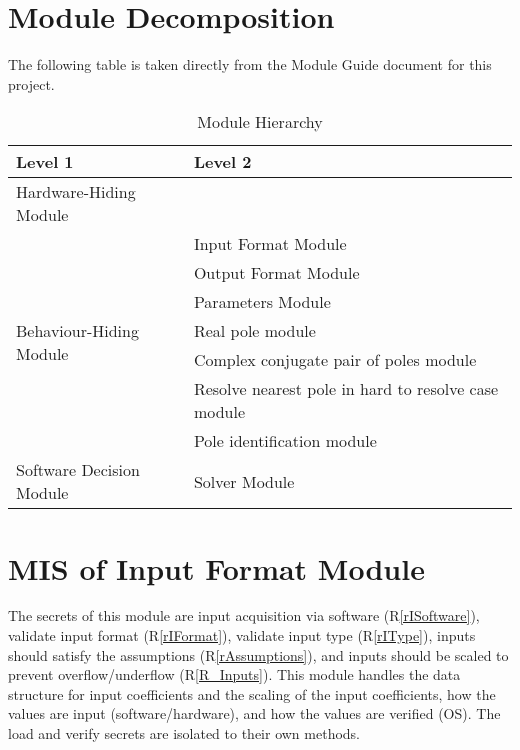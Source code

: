 \documentclass[12pt, titlepage]{article}
\newcommand{\rref}[1]{(R\ref{#1})}
\begin{document}
\section{Module Decomposition}

The following table is taken directly from the Module Guide document for this project.

\begin{table}[!ht]
\centering
\begin{tabular}{p{} p{}}
\toprule
\textbf{Level 1} & \textbf{Level 2}\\
\midrule

\multirow{1}{0.3\textwidth}{Hardware-Hiding Module}
  & \\

\midrule

\multirow{7}{0.3\textwidth}{Behaviour-Hiding Module}
  & Input Format Module\\
  & Output Format Module \\
  & Parameters Module\\
  & Real pole module\\
  & Complex conjugate pair of poles module\\ 
  & Resolve nearest pole in hard to resolve case module\\
  & Pole identification module\\
\midrule

{Software Decision Module} & Solver Module\\
\bottomrule

\end{tabular}
\caption{Module Hierarchy}
\label{tb:module}
\end{table}

\section{MIS of Input Format Module} \label{sc:MIS_IN}

The secrets of this module are
 input acquisition via software \rref{rISoftware},
 validate input format \rref{rIFormat},
 validate input type \rref{rIType},
 inputs should satisfy the assumptions \rref{rAssumptions}, and
 inputs should be scaled to prevent overflow/underflow \rref{R_Inputs}.
This module handles the data structure for input coefficients and the scaling of
 the input coefficients, how the values are input (software/hardware),
 and how the values are verified (OS).
The load and verify secrets are isolated to their own methods.
\end{document}
